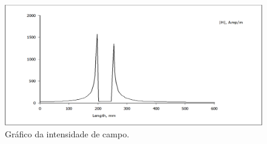 \begin{figure}[H]
\centering
\includegraphics[scale=0.3]{img/assig1/linha_H.png}
\caption[Gráfico da intensidade de campo]{Gráfico da intensidade de campo.}
\label{graf2_ic}
\end{figure}
